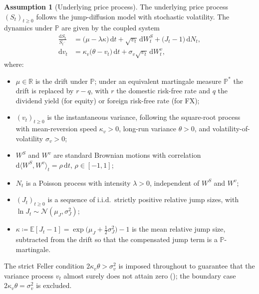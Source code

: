 \documentclass[preprint,12pt,authoryear]{elsarticle}
\newcommand{\RR}{\mathbb{R}}
\newcommand{\EE}{\mathbb{E}}
\newcommand{\PP}{\mathbb{P}}
\newcommand{\dd}{\mathrm{d}}
\theoremstyle{definition}
\newtheorem{assumption}{Assumption}[section]
\begin{document}
\begin{assumption}[Underlying price process]
\label{ass:bates}
The underlying price process $(S_t)_{t \geq 0}$ follows the
\citet{Bates1996} jump-diffusion model with stochastic volatility. The
dynamics under $\PP$ are given by the coupled system
\begin{align}
    \frac{\dd S_t}{S_{t^{-}}}
    &= \bigl( \mu - \lambda \kappa \bigr) \, \dd t
       + \sqrt{v_t}\, \dd W^{S}_{t}
       + \bigl( J_t - 1 \bigr) \, \dd N_t,
    \label{eq:bates-S} \\[4pt]
    \dd v_t
    &= \kappa_v \bigl( \theta - v_t \bigr) \, \dd t
       + \sigma_v \sqrt{v_t}\, \dd W^{v}_{t},
    \label{eq:heston-v}
\end{align}
where:
\begin{itemize}
    \item $\mu \in \RR$ is the drift under $\PP$; under an equivalent
    martingale measure $\PP^{*}$ the drift is replaced by $r - q$,
    with $r$ the domestic risk-free rate and $q$ the dividend yield
    (for equity) or foreign risk-free rate (for FX);
    \item $(v_t)_{t \geq 0}$ is the instantaneous variance, following
    the \citet{Heston1993} square-root process with mean-reversion
    speed $\kappa_v > 0$, long-run variance $\theta > 0$, and
    volatility-of-volatility $\sigma_v > 0$;
    \item $W^{S}$ and $W^{v}$ are standard Brownian motions with
    correlation $\dd \langle W^{S}, W^{v} \rangle_{t} = \rho \, \dd t$,
    $\rho \in [-1, 1]$;
    \item $N_t$ is a Poisson process with intensity $\lambda > 0$,
    independent of $W^{S}$ and $W^{v}$;
    \item $(J_t)_{t \geq 0}$ is a sequence of i.i.d.\ strictly positive
    relative jump sizes, with $\ln J_t \sim \mathcal{N}(\mu_J, \sigma_J^2)$;
    \item $\kappa \coloneqq \EE[J_t - 1]
    = \exp\!\bigl(\mu_J + \tfrac{1}{2}\sigma_J^{2}\bigr) - 1$
    is the mean relative jump size, subtracted from the drift so that
    the compensated jump term is a $\PP$-martingale.
\end{itemize}
The strict Feller condition $2\kappa_v \theta > \sigma_v^{2}$ is
imposed throughout to guarantee that the variance process $v_t$
almost surely does not attain zero (\citealp{Heston1993}); the
boundary case $2\kappa_v \theta = \sigma_v^{2}$ is excluded.
\end{assumption}
\end{document}
